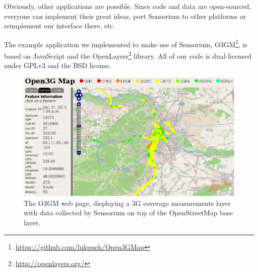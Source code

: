 Obviously, other applications are possible. Since code and data are open-sourced, everyone can implement their great ideas, port Sensorium to other platforms or reimplement our interface there, etc.

The example application we implemented to make use of Sensorium, O3GM\footnote{\url{https://github.com/lukpueh/Open3GMap}}, is based on JavaScript and the OpenLayers\footnote{\url{http://openlayers.org/}} library. All of our code is dual-licensed under \gls{GPLv3} and the \acrshort{BSD} license.


\begin{figure}[htb]
\centering
\includegraphics[width=\textwidth]{images/o3gm.png}
\caption{The \gls{O3GM} web page, displaying a \gls{3G} coverage measurements layer with data collected by Sensorium on top of the OpenStreetMap base layer.}
\label{c5:fig:ogggm}
\end{figure}







